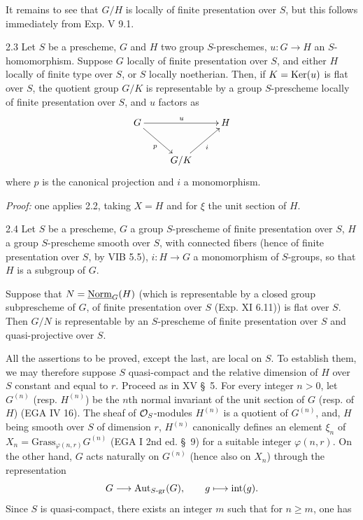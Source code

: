 It remains to see that $G/H$ is locally of finite presentation over $S$, but this follows immediately from Exp. V 9.1.
\begin{corollary}{2.3}\label{XVI.2.3}
Let $S$ be a prescheme, $G$ and $H$ two group $S$-preschemes, $u:G\to H$ an $S$-homomorphism. Suppose $G$ locally of finite presentation over $S$, and either $H$ locally of finite type over $S$, or $S$ locally noetherian. Then, if $K=\operatorname{Ker}(u)$ is flat over $S$, the quotient group $G/K$ is representable by a group $S$-prescheme locally of finite presentation over $S$, and $u$ factors as
\[
\xymatrix{G\ar[rr]^u\ar[dr]_p&&H\\&G/K\ar[ur]_i&}
\]
where $p$ is the canonical projection and $i$ a monomorphism.
\end{corollary}
\par\noindent\emph{Proof:} one applies 2.2, taking $X=H$ and for $\xi$ the unit section of $H$.
\begin{corollary}{2.4}\label{XVI.2.4}
Let $S$ be a prescheme, $G$ a group $S$-prescheme of finite presentation over $S$, $H$ a group $S$-prescheme smooth over $S$, with connected fibers (hence of finite presentation over $S$, by VIB 5.5), $i:H\to G$ a monomorphism of $S$-groups, so that $H$ is a subgroup of $G$.

Suppose that $N=\underline{\mathrm{Norm}}_G(H)$ (which is representable by a closed group subprescheme of $G$, of finite presentation over $S$ (Exp. XI 6.11)) is flat over $S$. Then $G/N$ is representable by an $S$-prescheme of finite presentation over $S$ and quasi-projective over $S$.
\end{corollary}
All the assertions to be proved, except the last, are local on $S$. To establish them, we may therefore suppose $S$ quasi-compact and the relative dimension of $H$ over $S$ constant and equal to $r$. Proceed as in XV \S\ 5. For every integer $n>0$, let $G^{(n)}$ (resp. $H^{(n)}$) be the $n$th normal invariant of the unit section of $G$ (resp. of $H$) (EGA IV 16). The sheaf of $\mathcal{O}_S$-modules $H^{(n)}$ is a quotient of $G^{(n)}$, and, $H$ being smooth over $S$ of dimension $r$, $H^{(n)}$ canonically defines an element $\xi_n$ of $X_n=\mathrm{Grass}_{\varphi(n,r)}G^{(n)}$ (EGA I 2nd ed. \S\ 9) for a suitable integer $\varphi(n,r)$. On the other hand, $G$ acts naturally on $G^{(n)}$ (hence also on $X_n$) through the representation
\[
G\longrightarrow\operatorname{Aut}_{S\text{-gr}}(G),\qquad g\longmapsto\operatorname{int}(g).
\]
Since $S$ is quasi-compact, there exists an integer $m$ such that for $n\geq m$, one has
